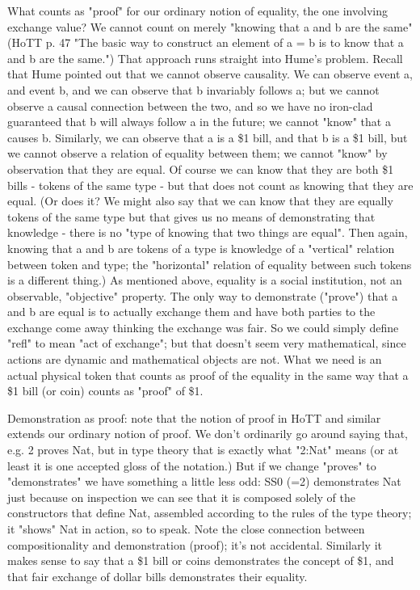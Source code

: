 \documentclass{article}
\begin{document}
What counts as "proof" for our ordinary notion of equality, the one
involving exchange value?  We cannot count on merely "knowing that a
and b are the same" (HoTT p. 47 "The basic way to construct an element
of a = b is to know that a and b are the same.")  That approach runs
straight into Hume's problem.  Recall that Hume pointed out that we
cannot observe causality.  We can observe event a, and event b, and we
can observe that b invariably follows a; but we cannot observe a
causal connection between the two, and so we have no iron-clad
guaranteed that b will always follow a in the future; we cannot "know"
that a causes b.  Similarly, we can observe that a is a \$1 bill, and
that b is a \$1 bill, but we cannot observe a relation of equality
between them; we cannot "know" by observation that they are equal.  Of
course we can know that they are both \$1 bills - tokens of the same
type - but that does not count as knowing that they are equal.  (Or
does it?  We might also say that we can know that they are equally
tokens of the same type but that gives us no means of demonstrating
that knowledge - there is no "type of knowing that two things are
equal".  Then again, knowing that a and b are tokens of a type is
knowledge of a "vertical" relation between token and type; the
"horizontal" relation of equality between such tokens is a different
thing.) As mentioned above, equality is a social institution, not an
observable, "objective" property.  The only way to demonstrate
("prove") that a and b are equal is to actually exchange them and have
both parties to the exchange come away thinking the exchange was fair.
So we could simply define "refl" to mean "act of exchange"; but that
doesn't seem very mathematical, since actions are dynamic and
mathematical objects are not.  What we need is an actual physical
token that counts as proof of the equality in the same way that a \$1
bill (or coin) counts as "proof" of \$1.

Demonstration as proof: note that the notion of proof in HoTT and
similar extends our ordinary notion of proof.  We don't ordinarily go
around saying that, e.g. 2 proves Nat, but in type theory that is
exactly what "2:Nat" means (or at least it is one accepted gloss of
the notation.)  But if we change "proves" to "demonstrates" we have
something a little less odd: SS0 (=2) demonstrates Nat just because on
inspection we can see that it is composed solely of the constructors
that define Nat, assembled according to the rules of the type theory;
it "shows" Nat in action, so to speak.  Note the close connection
between compositionality and demonstration (proof); it's not
accidental.  Similarly it makes sense to say that a \$1 bill or coins
demonstrates the concept of \$1, and that fair exchange of dollar bills
demonstrates their equality.
\end{document}
